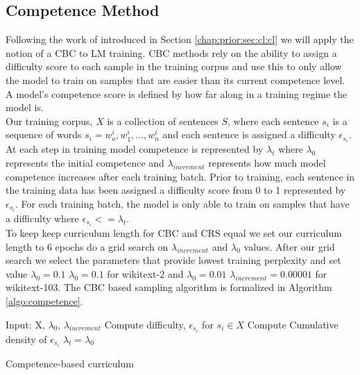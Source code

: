 \subsection{Competence Method}
Following the work of \cite{Platanios2019CompetencebasedCL} introduced in Section \ref{chap:prior:sec:cl:cl} we will apply the notion of a CBC to LM training. CBC methods rely on the ability to assign a difficulty score to each sample in the training corpus and use this to only allow the model to train on samples that are easier than its current competence level. A model's competence score is defined by how far along in a training regime the model is. \\
Our training corpus, $X$ is a collection of sentences $S$, where each sentence $s_i$ is a sequence of words $s_i= w_o^i,w_1^i,...,w_n^i$ and each sentence is assigned a difficulty $\epsilon_{s_i}$. At each step in training model competence is represented by $\lambda_t$ where $\lambda_0$ represents the initial competence and $\lambda_{increment}$ represents how much model competence increases after each training batch. Prior to training, each sentence in the training data has been assigned a difficulty score from 0 to 1 represented by $\epsilon_{s_i}$. For each training batch, the model is only able to train on samples that have a difficulty where $\epsilon_{s_i} <= \lambda_t$. \\
To keep keep curriculum length for CBC and CRS equal we set our curriculum length to 6 epochs do a grid search on $\lambda_{increment}$ and $\lambda_0$ values. After our grid search we select the parameters that provide lowest training perplexity and set value $\lambda_0 = 0.1$  $\lambda_0 = 0.1$ for wikitext-2 and $\lambda_0 = 0.01$ $\lambda_{increment} = 0.00001$ for wikitext-103. The CBC based sampling algorithm is formalized in Algorithm \ref{algo:competence}. \\
\begin{algorithm}[H]
\label{algo:competence}
\SetAlgoLined
{}
Input: X, $\lambda_0$, $\lambda_{increment}$ \;
Compute difficulty, $\epsilon_{s_i}$ for $s_i \in X$\;
Compute Cumulative density of $\epsilon_{s_i}$\;
$\lambda_t = \lambda_0$\;
\caption{Competence-based curriculum}
\end{algorithm}
